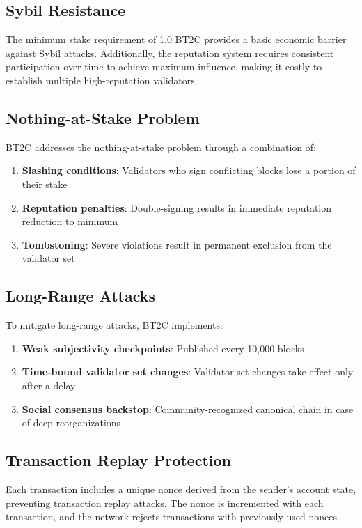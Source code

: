 \documentclass[10pt,a4paper]{article}
\begin{document}
\subsection{Sybil Resistance}
The minimum stake requirement of 1.0 BT2C provides a basic economic barrier against Sybil attacks. Additionally, the reputation system requires consistent participation over time to achieve maximum influence, making it costly to establish multiple high-reputation validators.

\subsection{Nothing-at-Stake Problem}
BT2C addresses the nothing-at-stake problem through a combination of:

\begin{enumerate}
\item \textbf{Slashing conditions}: Validators who sign conflicting blocks lose a portion of their stake
\item \textbf{Reputation penalties}: Double-signing results in immediate reputation reduction to minimum
\item \textbf{Tombstoning}: Severe violations result in permanent exclusion from the validator set
\end{enumerate}

\subsection{Long-Range Attacks}
To mitigate long-range attacks, BT2C implements:

\begin{enumerate}
\item \textbf{Weak subjectivity checkpoints}: Published every 10,000 blocks
\item \textbf{Time-bound validator set changes}: Validator set changes take effect only after a delay
\item \textbf{Social consensus backstop}: Community-recognized canonical chain in case of deep reorganizations
\end{enumerate}

\subsection{Transaction Replay Protection}
Each transaction includes a unique nonce derived from the sender's account state, preventing transaction replay attacks. The nonce is incremented with each transaction, and the network rejects transactions with previously used nonces.
\end{document}
